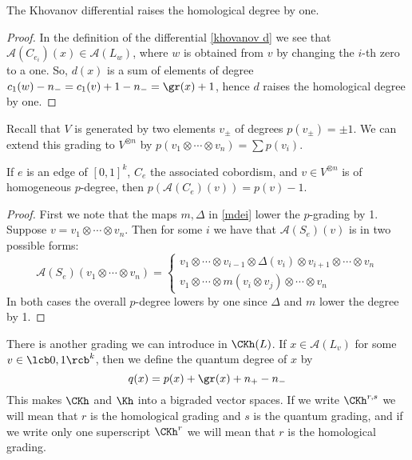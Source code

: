 \begin{prop}
\label{d raises hom degree}
The Khovanov differential raises the homological degree by one.
\end{prop}
\begin{proof}
In the definition of the differential \eqref{khovanov d} we see that $\mathcal A(C_{e_i})(x) \in \mathcal A(L_w)$, where $w$ is obtained from $v$ by changing the $i$-th zero to a one. So, $d(x)$ is a sum of elements of degree $c_1(w)-n_- = c_1(v)+1-n_- = \gr(x)+1$, hence $d$ raises the homological degree by one.
\end{proof}

Recall that $V$ is generated by two elements $v_\pm$ of degrees $p(v_\pm) = \pm 1$. We can extend this grading to $V^{\otimes n}$ by $p(v_1 \otimes \cdots \otimes v_n) = \sum p(v_i)$. 

\begin{prop}
\label{d lowers p degree}
If $e$ is an edge of $[0,1]^k$, $C_e$ the associated cobordism, and $v \in V^{\otimes n}$ is of homogeneous $p$-degree, then $p(\mathcal A(C_e)(v)) = p(v) - 1$.
\end{prop}
\begin{proof}
First we note that the maps $m,\Delta$ in \eqref{mdei} lower the $p$-grading by 1. Suppose $v = v_1 \otimes \cdots \otimes v_n$. Then for some $i$ we have that $\mathcal A(S_e)(v)$ is in two possible forms:
\[
\mathcal A(S_e)(v_1 \otimes \cdots \otimes v_n) = \begin{cases}
																										 v_1 \otimes \cdots \otimes v_{i-1} \otimes \Delta(v_i) \otimes v_{i+1} \otimes \cdots \otimes v_n \\
																										 v_1 \otimes \cdots \otimes m(v_i \otimes v_j) \otimes \cdots \otimes v_n 
																									\end{cases}
\]
In both cases the overall $p$-degree lowers by one since $\Delta$ and $m$ lower the degree by 1.
\end{proof}


There is another grading we can introduce in $\CKh(L)$. If $x \in \mathcal A(L_v)$ for some $v \in \lcb 0,1 \rcb^k$, then we define the quantum degree of $x$ by
\begin{equation}
\label{q grading}
q(x) = p(x) + \gr(x) + n_+ - n_-
\end{equation}
This makes $\CKh$ and $\Kh$ into a bigraded vector spaces. If we write $\CKh^{r,s}$ we will mean that $r$ is the homological grading and $s$ is the quantum grading, and if we write only one superscript $\CKh^r$ we will mean that $r$ is the homological grading.

